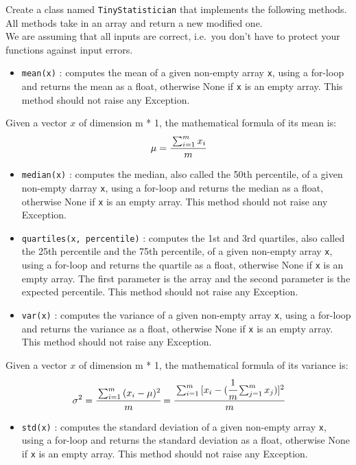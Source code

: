 \documentclass[]{article}
\providecommand{\tightlist}{%
  \setlength{\itemsep}{0pt}\setlength{\parskip}{0pt}}
\begin{document}
Create a class named \texttt{TinyStatistician} that implements the
following methods.\\
All methods take in an array and return a new modified one.\\
We are assuming that all inputs are correct, i.e.~you don't have to
protect your functions against input errors.

\begin{itemize}
\tightlist
\item
  \texttt{mean(x)} : computes the mean of a given non-empty array
  \texttt{x}, using a for-loop and returns the mean as a float,
  otherwise None if \texttt{x} is an empty array. This method should not
  raise any Exception.
\end{itemize}

Given a vector \(x\) of dimension m * 1, the mathematical formula of its
mean is: \large \[
\mu = \cfrac{\sum_{i = 1}^{m}{x_i}}{m}
\] \normalsize

\begin{itemize}
\item
  \texttt{median(x)} : computes the median, also called the 50th
  percentile, of a given non-empty darray \texttt{x}, using a for-loop
  and returns the median as a float, otherwise None if \texttt{x} is an
  empty array. This method should not raise any Exception.
\item
  \texttt{quartiles(x,\ percentile)} : computes the 1st and 3rd
  quartiles, also called the 25th percentile and the 75th percentile, of
  a given non-empty array \texttt{x}, using a for-loop and returns the
  quartile as a float, otherwise None if \texttt{x} is an empty array.
  The first parameter is the array and the second parameter is the
  expected percentile. This method should not raise any Exception.
\item
  \texttt{var(x)} : computes the variance of a given non-empty array
  \texttt{x}, using a for-loop and returns the variance as a float,
  otherwise None if \texttt{x} is an empty array. This method should not
  raise any Exception.
\end{itemize}

Given a vector \(x\) of dimension m * 1, the mathematical formula of its
variance is: \large \[
\sigma^2 = \cfrac{\sum_{i = 1}^{m}{(x_i - \mu)^2}}{m} = \cfrac{\sum_{i = 1}^{m}{[x_i - (\cfrac{1}{m}\sum_{j = 1}^{m}{x_j}})]^2}{m}
\] \normalsize

\begin{itemize}
\tightlist
\item
  \texttt{std(x)} : computes the standard deviation of a given non-empty
  array \texttt{x}, using a for-loop and returns the standard deviation
  as a float, otherwise None if \texttt{x} is an empty array. This
  method should not raise any Exception.
\end{itemize}
\end{document}
